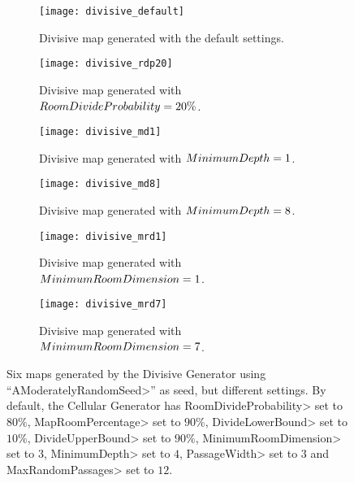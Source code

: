 \begin{figure}[tp]
	\centering
  	\begin{subfigure}[t]{0.315\linewidth}
		\texttt{[image: divisive\_default]}
     		\caption{Divisive map generated with the default settings.}
 	\end{subfigure}
	\hfill
  	\begin{subfigure}[t]{0.315\linewidth}
    		\texttt{[image: divisive\_rdp20]}
    		\caption{Divisive map generated with $Room\-Di\-vide\-Prob\-a\-bil\-i\-ty = 20\%$.}
  	\end{subfigure}
	\hfill
  	\begin{subfigure}[t]{0.315\linewidth}
    		\texttt{[image: divisive\_md1]}
    		\caption{Divisive map generated with $Min\-i\-mum\-Depth = 1$.}
  	\end{subfigure}
  	
  	\begin{subfigure}[t]{0.315\linewidth}
		\texttt{[image: divisive\_md8]}
     		\caption{Divisive map generated with $Min\-i\-mum\-Depth= 8$.}
 	\end{subfigure}
 	\hfill
  	\begin{subfigure}[t]{0.315\linewidth}
    		\texttt{[image: divisive\_mrd1]}
     		\caption{Divisive map generated with $Min\-i\-mum\-Room\-Di\-men\-sion = 1$.}
  	\end{subfigure}
	\hfill
  	\begin{subfigure}[t]{0.315\linewidth}
    		\texttt{[image: divisive\_mrd7]}
     		\caption{Divisive map generated with $Min\-i\-mum\-Room\-Di\-men\-sion = 7$.}
  	\end{subfigure}	
	\caption[Six maps generated by the Divisive Generator using ``\<AModeratelyRandomSeed>'' as seed, but different settings.]{Six maps generated by the Divisive Generator using ``\<AModeratelyRandomSeed>'' as seed, but different settings. By default, the Cellular Generator has \<Room\-Di\-vide\-Prob\-a\-bil\-i\-ty> set to $80\%$, \<Map\-Room\-Per\-cent\-age> set to $90\%$,  \<Di\-vide\-Low\-er\-Bound> set to $10\%$,  \<Di\-vide\-Up\-per\-Bound> set to $90\%$,  \<Min\-i\-mum\-Room\-Di\-men\-sion> set to $3$, \<Min\-i\-mum\-Depth> set to $4$, \<Pas\-sage\-Width> set to $3$ and \<Max\-Ran\-dom\-Pas\-sages> set to $12$.}
	\label{fig:divisives}
\end{figure}

